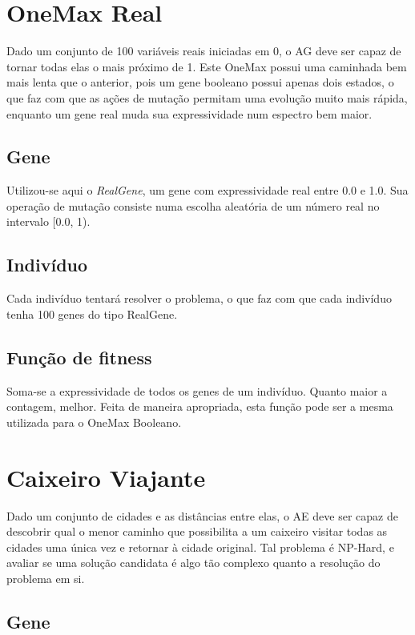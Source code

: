 \section{OneMax Real}

Dado um conjunto de 100 variáveis reais iniciadas em 0, o AG deve ser capaz de tornar todas elas o mais próximo de 1. Este OneMax possui uma caminhada bem mais lenta que o anterior, pois um gene booleano possui apenas dois estados, o que faz com que as ações de mutação permitam uma evolução muito mais rápida, enquanto um gene real muda sua expressividade num espectro bem maior.

\subsection*{Gene}

Utilizou-se aqui o \emph{RealGene}, um gene com expressividade real entre 0.0 e 1.0. Sua operação de mutação consiste numa escolha aleatória de um número real no intervalo [0.0, 1).

\subsection*{Indivíduo}

Cada indivíduo tentará resolver o problema, o que faz com que cada indivíduo tenha 100 genes do tipo RealGene.

\subsection*{Função de fitness}

Soma-se a expressividade de todos os genes de um indivíduo. Quanto maior a contagem, melhor. Feita de maneira apropriada, esta função pode ser a mesma utilizada para o OneMax Booleano.

\section{Caixeiro Viajante}

Dado um conjunto de cidades e as distâncias entre elas, o AE deve ser capaz de descobrir qual o menor caminho que possibilita a um caixeiro visitar todas as cidades uma única vez e retornar à cidade original. Tal problema é NP-Hard, e avaliar se uma solução candidata é algo tão complexo quanto a resolução do problema em si.

\subsection*{Gene}

